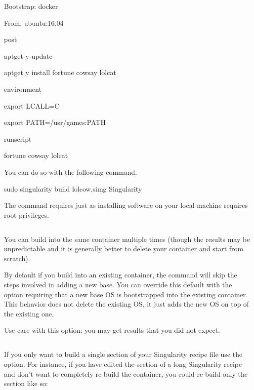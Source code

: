 \documentclass[letterpaper,10pt,english]{sphinxmanual}
\begin{document}
%
\begin{sphinxVerbatim}[commandchars=\\\{\}]
Bootstrap: docker

From: ubuntu:16.04


\PYGZpc{}post

    apt\PYGZhy{}get \PYGZhy{}y update

    apt\PYGZhy{}get \PYGZhy{}y install fortune cowsay lolcat


\PYGZpc{}environment

    export LC\PYGZus{}ALL=C

    export PATH=/usr/games:\PYGZdl{}PATH


\PYGZpc{}runscript

    fortune \textbar{} cowsay \textbar{} lolcat
\end{sphinxVerbatim}

You can do so with the following command.

%
\begin{sphinxVerbatim}[commandchars=\\\{\}]
\PYGZdl{} sudo singularity build lolcow.simg Singularity
\end{sphinxVerbatim}

The command requires  just as installing software on your local machine
requires root privileges.


\subsection{}
\label{\detokenize{build_a_container:force}}
You can build into the same container multiple times (though the
results may be unpredictable and it is generally better to delete your
container and start from scratch).

By default if you build into an existing container, the  command will
skip the steps involved in adding a new base. You can override this
default with the  option requiring that a new base OS is bootstrapped
into the existing container. This behavior does not delete the
existing OS, it just adds the new OS on top of the existing one.

Use care with this option: you may get results that you did not
expect.


\subsection{}
\label{\detokenize{build_a_container:section}}
If you only want to build a single section of your Singularity recipe
file use the  option. For instance, if you have edited the  section of a
long Singularity recipe and don’t want to completely re-build the
container, you could re-build only the  section like so:
\end{document}
